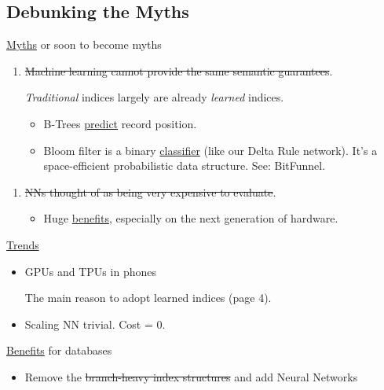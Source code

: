 \documentclass[presentation]{beamer}
\begin{document}
\subsection{Debunking the Myths}
\label{sec:org626fc7f}
\begin{frame}[label={sec:orgd6d3c71}]{\uline{Myths} or soon to become myths}
\begin{enumerate}
\item \sout{Machine learning cannot provide the same semantic guarantees}.

\emph{Traditional} indices largely \alert{are already} \emph{learned} indices.
\begin{itemize}
\item B-Trees \uline{\alert{predict}} record position.
\item Bloom filter is a binary \uline{\alert{classifier}} (like our Delta Rule network).
It's a space-efficient probabilistic data structure. See: BitFunnel.
\end{itemize}
\end{enumerate}

\begin{enumerate}
\item \sout{NNs thought of as being very expensive to evaluate}.
\begin{itemize}
\item Huge \uline{\alert{benefits}}, especially on the next generation of hardware.
\end{itemize}
\end{enumerate}
\end{frame}

\begin{frame}[label={sec:org9121f05}]{\uline{Trends}}
\begin{itemize}
\item GPUs and TPUs in phones

The main reason to adopt learned indices (page 4).
\item Scaling NN trivial. Cost = 0.
\end{itemize}
\end{frame}

\begin{frame}[label={sec:org2a04baf}]{\uline{Benefits} for databases}
\begin{itemize}
\item Remove the \sout{branch-heavy index structures} and add \alert{Neural Networks}
\end{itemize}
\end{frame}
\end{document}
